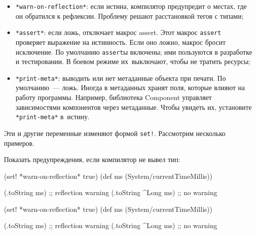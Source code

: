 \begin{itemize}


\item
  \verb|*warn-on-reflection*|: если истина, компилятор предупредит о местах, где
  он обратился к рефлексии. Проблему решают расстановкой тегов с типами;


\item
  \verb|*assert*|: если ложь, отключает макрос assert. Этот макрос \verb|assert|
  проверяет выражение на истинность. Если оно ложно, макрос бросит исключение.
  По умолчанию \verb|assert|ы включены; ими пользуются в разработке и
  тестировании. В боевом режиме их~выключают, чтобы не тратить ресурсы;

\label{print-meta}


\item
  \verb|*print-meta*|: выводить или нет метаданные объекта при печати. По
  умолчанию~--- ложь. Иногда в метаданных хранят поля, которые влияют на работу
  программы. Например, библиотека Component управляет зависимостями компонентов
  через метаданные. Чтобы увидеть их, установите \verb|*print-meta*| в~истину.

\end{itemize}

Эти и другие переменные изменяют формой \verb|set!|. Рассмотрим несколько
примеров.

Показать предупреждения, если компилятор не вывел тип:

\ifnarrow

\begin{english}
  \begin{clojure}
(set! *warn-on-reflection* true)
(def ms (System/currentTimeMillis))

(.toString ms) ;; reflection warning
(.toString ^Long ms) ;; no warning
  \end{clojure}
\end{english}

\else

\begin{english}
  \begin{clojure}
(set! *warn-on-reflection* true)
(def ms (System/currentTimeMillis))

(.toString ms)       ;; reflection warning
(.toString ^Long ms) ;; no warning
  \end{clojure}
\end{english}

